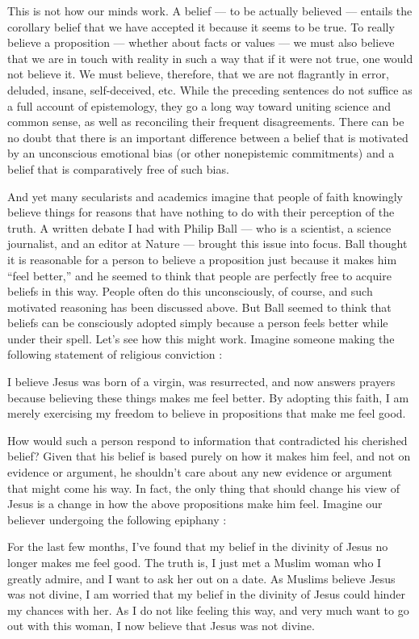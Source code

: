 \documentclass[a4paper,14pt]{extarticle}
\begin{document}
This is not how our minds work.
A belief --- to be actually believed --- entails the corollary belief that we have accepted it because it seems to be true.
To really believe a proposition --- whether about facts or values --- we must also believe that we are in touch with reality in such a way that if it were not true, one would not believe it.
We must believe, therefore, that we are not flagrantly in error, deluded, insane, self-deceived, etc.
While the preceding sentences do not suffice as a full account of epistemology, they go a long way toward uniting science and common sense, as well as reconciling their frequent disagreements.
There can be no doubt that there is an important difference between a belief that is motivated by an unconscious emotional bias (or other nonepistemic commitments) and a belief that is comparatively free of such bias.

And yet many secularists and academics imagine that people of faith knowingly believe things for reasons that have nothing to do with their perception of the truth.
A written debate I had with Philip Ball --- who is a scientist, a science journalist, and an editor at Nature --- brought this issue into focus.
Ball thought it is reasonable for a person to believe a proposition just because it makes him ``feel better,'' and he seemed to think that people are perfectly free to acquire beliefs in this way.
People often do this unconsciously, of course, and such motivated reasoning has been discussed above.
But Ball seemed to think that beliefs can be consciously adopted simply because a person feels better while under their spell.
Let’s see how this might work.
Imagine someone making the following statement of religious conviction :

I believe Jesus was born of a virgin, was resurrected, and now answers prayers because believing these things makes me feel better.
By adopting this faith, I am merely exercising my freedom to believe in propositions that make me feel good.

How would such a person respond to information that contradicted his cherished belief?
Given that his belief is based purely on how it makes him feel, and not on evidence or argument, he shouldn’t care about any new evidence or argument that might come his way.
In fact, the only thing that should change his view of Jesus is a change in how the above propositions make him feel.
Imagine our believer undergoing the following epiphany :

For the last few months, I’ve found that my belief in the divinity of Jesus no longer makes me feel good.
The truth is, I just met a Muslim woman who I greatly admire, and I want to ask her out on a date.
As Muslims believe Jesus was not divine, I am worried that my belief in the divinity of Jesus could hinder my chances with her.
As I do not like feeling this way, and very much want to go out with this woman, I now believe that Jesus was not divine.
\end{document}
